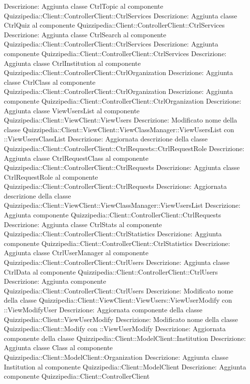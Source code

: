 Descrizione: Aggiunta classe CtrlTopic al componente Quizzipedia::Client::ControllerClient::CtrlServices 
Descrizione: Aggiunta classe CtrlQuiz al componente Quizzipedia::Client::ControllerClient::CtrlServices 
Descrizione: Aggiunta classe CtrlSearch al componente Quizzipedia::Client::ControllerClient::CtrlServices 
Descrizione: Aggiunta componente Quizzipedia::Client::ControllerClient::CtrlServices 
Descrizione: Aggiunta classe CtrlInstitution al componente Quizzipedia::Client::ControllerClient::CtrlOrganization 
Descrizione: Aggiunta classe CtrlClass al componente Quizzipedia::Client::ControllerClient::CtrlOrganization 
Descrizione: Aggiunta componente Quizzipedia::Client::ControllerClient::CtrlOrganization 
Descrizione: Aggiunta classe ViewUsersList al componente Quizzipedia::Client::ViewClient::ViewUsers 
Descrizione: Modificato nome della classe Quizzipedia::Client::ViewClient::ViewClassManager::ViewUsersList con ::ViewUsersClassList 
Descrizione: Aggiornata descrizione della classe Quizzipedia::Client::ControllerClient::CtrlRequests::CtrlRequestRole 
Descrizione: Aggiunta classe CtrlRequestClass al componente Quizzipedia::Client::ControllerClient::CtrlRequests 
Descrizione: Aggiunta classe CtrlRequestRole al componente Quizzipedia::Client::ControllerClient::CtrlRequests 
Descrizione: Aggiornata descrizione della classe Quizzipedia::Client::ViewClient::ViewClassManager::ViewUsersList 
Descrizione: Aggiunta componente Quizzipedia::Client::ControllerClient::CtrlRequests 
Descrizione: Aggiunta classe CtrlStats al componente Quizzipedia::Client::ControllerClient::CtrlStatistics 
Descrizione: Aggiunta componente Quizzipedia::Client::ControllerClient::CtrlStatistics 
Descrizione: Aggiunta classe CtrlUserManager al componente Quizzipedia::Client::ControllerClient::CtrlUsers 
Descrizione: Aggiunta classe CtrlData al componente Quizzipedia::Client::ControllerClient::CtrlUsers 
Descrizione: Aggiunta componente Quizzipedia::Client::ControllerClient::CtrlUsers 
Descrizione: Modificato nome della classe Quizzipedia::Client::ViewClient::ViewUsers::ViewUserModify con ::ViewModifyUser 
Descrizione: Aggiornata componente della classe Quizzipedia::Client::ViewUserModify 
Descrizione: Modificato nome della classe Quizzipedia::Client::Modify con ::ViewUserModify 
Descrizione: Aggiornata componente della classe Quizzipedia::Client::ModelClient::Institution 
Descrizione: Aggiunta classe Class al componente Quizzipedia::Client::ModelClient::Organization 
Descrizione: Aggiunta classe Institution al componente Quizzipedia::Client::ModelClient 
Descrizione: Aggiunta componente Quizzipedia::Client::ControllerClient 
